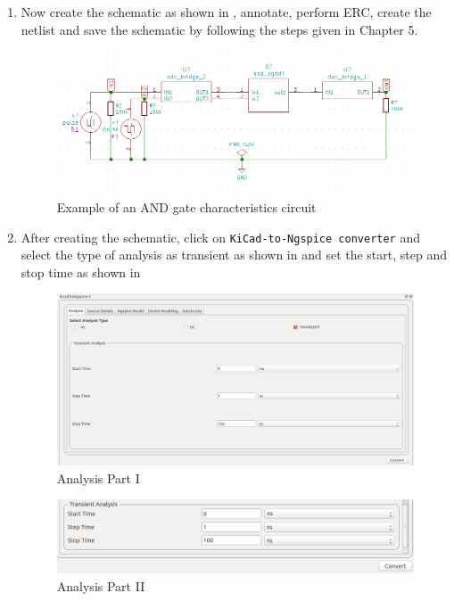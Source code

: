 \begin{enumerate}
\item Now create the schematic as shown in , annotate, perform ERC, create the netlist and save the schematic by following the steps given in Chapter 5.
\begin{figure}[!htp]
            \centering
            \includegraphics[width =\hgfig]{./NGHDL/screen14.png}
            \caption{Example of an AND gate characteristics circuit}
            \label{screen14}
        \end{figure}

\item After creating the schematic, click on \texttt{KiCad-to-Ngspice converter} and select the type of analysis as transient as shown in  and set the start, step and stop time as shown in 
   \begin{figure}[!htp]
                \centering
                \includegraphics[width =\hgfig]{./NGHDL/screen15.png}
                \caption{Analysis Part I}
                \label{screen15}
            \end{figure}
           \begin{figure}[!htp]
            \centering
            \includegraphics[width =\hgfig]{./NGHDL/screen16.png}
            \caption{Analysis Part II}
            \label{screen16}
        \end{figure}
\pagebreak


\end{enumerate}
